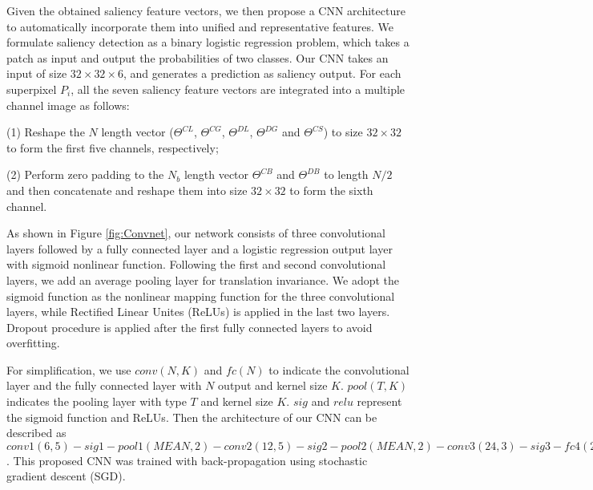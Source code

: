 \documentclass[journal]{IEEEtran}
\begin{document}
Given the obtained saliency feature vectors, we then propose a CNN architecture to automatically incorporate them into unified and representative features. We formulate saliency detection as a binary logistic regression problem, which takes a patch as input and output the probabilities of two classes. Our CNN takes an input of size $32 \times 32 \times 6$, and generates a prediction as saliency output. For each superpixel $P_i$, all the seven saliency feature vectors are integrated into a multiple channel image as follows:

(1) Reshape the $N$ length vector (${\Theta ^{CL}}$, ${\Theta ^{CG}}$, ${\Theta ^{DL}}$, ${\Theta ^{DG}}$ and ${\Theta ^{CS}}$) to size $32 \times 32$ to form the first five channels, respectively;

(2) Perform zero padding to the $N_b$ length vector ${\Theta ^{CB}}$ and ${\Theta ^{DB}} $ to length $N/2$ and then concatenate and reshape them into size $32 \times 32$ to form the sixth channel.

As shown in Figure \ref{fig:Convnet}, our network consists of three convolutional layers followed by a fully connected layer and a logistic regression output layer with sigmoid nonlinear function. Following the first and second convolutional layers, we add an average pooling layer for translation invariance. We adopt the sigmoid function as the nonlinear mapping function for the three convolutional layers, while Rectified Linear Unites (ReLUs) is applied in the last two layers. Dropout procedure is applied after the first fully connected layers to avoid overfitting.

For simplification, we use $conv(N,K)$ and $fc(N)$ to indicate the convolutional layer and the fully connected layer with $N$ output and kernel size $K$. $pool(T,K)$ indicates the pooling layer with type $T$ and kernel size $K$. $sig$ and $relu$ represent the sigmoid function and ReLUs. Then the architecture of our CNN can be described as $conv1(6,5)-sig1-pool1(MEAN,2)-conv2(12,5)-sig2-pool2(MEAN,2)-conv3(24,3)-sig3-fc4(200)-relu4-dropout4-fc5(2)$. This proposed CNN was trained with back-propagation using stochastic gradient descent (SGD).
\end{document}
